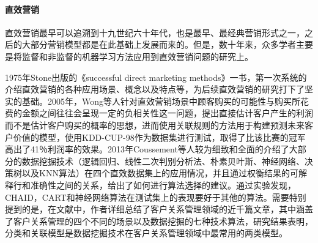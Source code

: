 \paragraph{直效营销}
直效营销最早可以追溯到十九世纪六十年代，也是最早、最经典营销形式之一，之后的大部分营销模型都是在此基础上发展而来的。但是，数十年来，众多学者主要是将监督和非监督的机器学习方法应用到直效营销问题的研究上。

1975年Stone出版的《successful direct marketing methods》\citep{stone1988successful}一书，第一次系统的介绍直效营销的各种应用场景、概念以及特点等，为后续直效营销的研究打下了坚实的基础。2005年，Wong等人\citep{wong2005mining}针对直效营销场景中顾客购买的可能性与购买所花费的金额之间往往会呈现一定的负相关性这一问题，提出直接估计客户产生的利润而不是估计客户购买的概率的思想，进而使用关联规则的方法用于构建预测未来客户价值的模型，使用KDD-CUP-98作为数据集进行测试，取得了比该比赛的冠军高出了41％利润率的效果。2013年Coussement等人\citep{coussement2015improving}较为细致和全面的介绍了大部分的数据挖掘技术（逻辑回归、线性二次判别分析法、朴素贝叶斯、神经网络、决策树以及KNN算法）在四个直效数据集上的应用情况，并且通过权衡结果的可解释行和准确性之间的关系，给出了如何进行算法选择的建议。通过实验发现，CHAID，CART和神经网络算法在测试集上的表现要好于其他的算法。需要特别提到的是，在文献\citep{ngai2009application}中，作者详细总结了客户关系管理领域的近千篇文章，其中涵盖了客户关系管理的四个不同的场景以及数据挖掘的七种技术算法，研究结果表明，分类和关联模型是数据挖掘技术在客户关系管理领域中最常用的两类模型。




